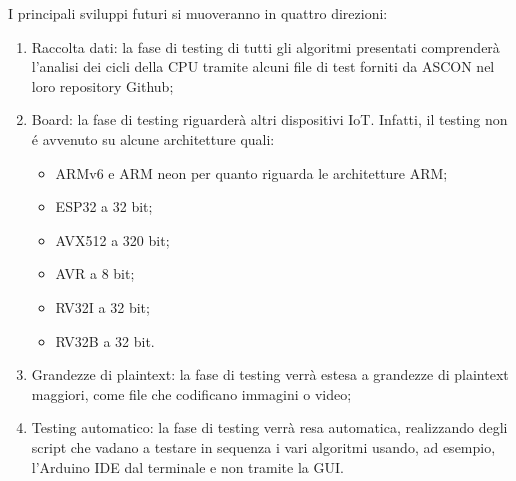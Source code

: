 I principali sviluppi futuri si muoveranno in quattro direzioni: \begin{enumerate}
    \item Raccolta dati: la fase di testing di tutti gli algoritmi presentati comprenderà l'analisi dei cicli della CPU tramite alcuni file di test forniti da ASCON nel loro repository Github\cite{github};
    \item Board: la fase di testing riguarderà altri dispositivi IoT. Infatti, il testing non é avvenuto su alcune architetture quali:
    \begin{itemize}
        \item ARMv6 e ARM neon per quanto riguarda le architetture ARM;
        \item ESP32 a 32 bit;
        \item AVX512 a 320 bit;
        \item AVR a 8 bit;
        \item RV32I a 32 bit;
        \item RV32B a 32 bit.
    \end{itemize}
    \item Grandezze di plaintext: la fase di testing verrà estesa a grandezze di plaintext maggiori, come file che codificano immagini o video;
    \item Testing automatico: la fase di testing verrà resa automatica, realizzando degli script che vadano a testare in sequenza i vari algoritmi usando, ad esempio, l'Arduino IDE dal terminale e non tramite la GUI.
\end{enumerate}
